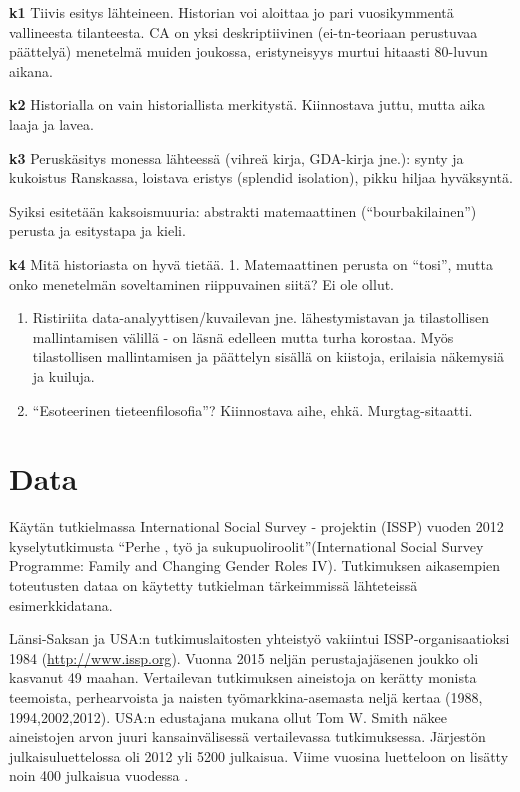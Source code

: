 \documentclass[
  finnish,
]{book}
\begin{document}
\textbf{k1} Tiivis esitys lähteineen. Historian voi aloittaa jo pari vuosikymmentä
vallineesta tilanteesta. CA on yksi deskriptiivinen (ei-tn-teoriaan perustuvaa
päättelyä) menetelmä muiden joukossa, eristyneisyys murtui hitaasti 80-luvun aikana.

\textbf{k2} Historialla on vain historiallista merkitystä. Kiinnostava juttu, mutta
aika laaja ja lavea.

\textbf{k3} Peruskäsitys monessa lähteessä (vihreä kirja, GDA-kirja jne.): synty ja
kukoistus Ranskassa, loistava eristys (splendid isolation), pikku hiljaa hyväksyntä.

Syiksi esitetään kaksoismuuria: abstrakti matemaattinen (``bourbakilainen'') perusta
ja esitystapa ja kieli.

\textbf{k4} Mitä historiasta on hyvä tietää.
1. Matemaattinen perusta on ``tosi'', mutta onko menetelmän soveltaminen riippuvainen
siitä? Ei ole ollut.

\begin{enumerate}
\def\labelenumi{\arabic{enumi}.}
\setcounter{enumi}{1}
\item
  Ristiriita data-analyyttisen/kuvailevan jne. lähestymistavan ja tilastollisen
  mallintamisen välillä - on läsnä edelleen mutta turha korostaa. Myös tilastollisen
  mallintamisen ja päättelyn sisällä on kiistoja, erilaisia näkemysiä ja kuiluja.
\item
  ``Esoteerinen tieteenfilosofia''? Kiinnostava aihe, ehkä. Murgtag-sitaatti.
\end{enumerate}

\hypertarget{data}{%
\chapter{Data}\label{data}}

Käytän tutkielmassa International Social Survey - projektin (ISSP) vuoden 2012
kyselytutkimusta ``Perhe , työ ja sukupuoliroolit''(International Social Survey
Programme: Family and Changing Gender Roles IV). Tutkimuksen aikasempien
toteutusten dataa on käytetty tutkielman tärkeimmissä lähteteissä esimerkkidatana.

Länsi-Saksan ja USA:n tutkimuslaitosten yhteistyö vakiintui ISSP-organisaatioksi
1984 (\url{http://www.issp.org}). Vuonna 2015 neljän perustajajäsenen joukko oli kasvanut 49 maahan.
Vertailevan tutkimuksen aineistoja on kerätty monista teemoista, perhearvoista
ja naisten työmarkkina-asemasta neljä kertaa (1988, 1994,2002,2012).
USA:n edustajana mukana ollut Tom W. Smith näkee aineistojen arvon juuri
kansainvälisessä vertailevassa tutkimuksessa. Järjestön julkaisuluettelossa oli
2012 yli 5200 julkaisua. Viime vuosina luetteloon on lisätty noin 400 julkaisua
vuodessa \citep{RefWorks:doc:5c0543a5e4b077eba1dc3cd8}.
\end{document}

